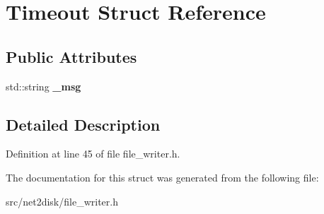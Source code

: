 \hypertarget{struct_timeout}{
\section{Timeout Struct Reference}
\label{struct_timeout}
}
\subsection*{Public Attributes}
\begin{DoxyCompactItemize}
\item 
\hypertarget{struct_timeout_acaff5a6cda2fbfc9088015bde9f2c2e7}{
std::string {\bfseries \_\-msg}}
\label{struct_timeout_acaff5a6cda2fbfc9088015bde9f2c2e7}

\end{DoxyCompactItemize}


\subsection{Detailed Description}


Definition at line 45 of file file\_\-writer.h.



The documentation for this struct was generated from the following file:\begin{DoxyCompactItemize}
\item 
src/net2disk/file\_\-writer.h\end{DoxyCompactItemize}
